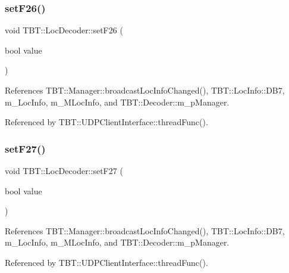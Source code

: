 \subsubsection{\texorpdfstring{set\+F26()}{setF26()}}
{\footnotesize\ttfamily void T\+B\+T\+::\+Loc\+Decoder\+::set\+F26 (\begin{DoxyParamCaption}\item[{bool}]{value }\end{DoxyParamCaption})\hspace{0.3cm}{\ttfamily [inline]}}



References T\+B\+T\+::\+Manager\+::broadcast\+Loc\+Info\+Changed(), T\+B\+T\+::\+Loc\+Info\+::\+D\+B7, m\+\_\+\+Loc\+Info, m\+\_\+\+M\+Loc\+Info, and T\+B\+T\+::\+Decoder\+::m\+\_\+p\+Manager.



Referenced by T\+B\+T\+::\+U\+D\+P\+Client\+Interface\+::thread\+Func().

\mbox{\label{classTBT_1_1LocDecoder_a7584ffb3eaf00b83b48217081049ff59_a7584ffb3eaf00b83b48217081049ff59}} 
\subsubsection{\texorpdfstring{set\+F27()}{setF27()}}
{\footnotesize\ttfamily void T\+B\+T\+::\+Loc\+Decoder\+::set\+F27 (\begin{DoxyParamCaption}\item[{bool}]{value }\end{DoxyParamCaption})\hspace{0.3cm}{\ttfamily [inline]}}



References T\+B\+T\+::\+Manager\+::broadcast\+Loc\+Info\+Changed(), T\+B\+T\+::\+Loc\+Info\+::\+D\+B7, m\+\_\+\+Loc\+Info, m\+\_\+\+M\+Loc\+Info, and T\+B\+T\+::\+Decoder\+::m\+\_\+p\+Manager.



Referenced by T\+B\+T\+::\+U\+D\+P\+Client\+Interface\+::thread\+Func().

\mbox{\label{classTBT_1_1LocDecoder_a66c6f1dcd471f19d019018ed3eed2e0f_a66c6f1dcd471f19d019018ed3eed2e0f}} 

